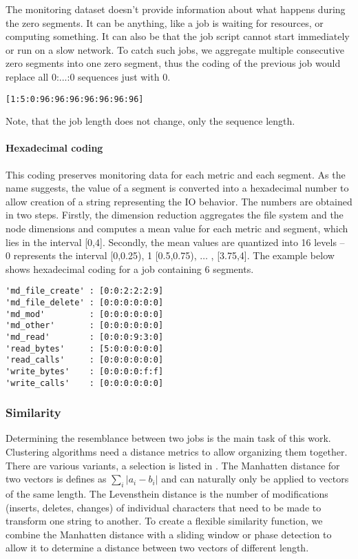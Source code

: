 \documentclass{jhps}
\begin{document}
The monitoring dataset doesn't provide information about what happens during the zero segments.
It can be anything, like a job is waiting for resources, or computing something.
It can also be that the job script cannot start immediately or run on a slow network.
To catch such jobs, we aggregate multiple consecutive zero segments into one zero segment, thus the coding of the previous job would replace all 0:...:0 sequences just with 0.

\begin{lstlisting}[caption={Binary coding of a 15 segments long job with zero aggregation applied.}]
[1:5:0:96:96:96:96:96:96:96]
\end{lstlisting}

Note, that the job length does not change, only the sequence length.

\paragraph*{Hexadecimal coding}

This coding preserves monitoring data for each metric and each segment.
As the name suggests, the value of a segment is converted into a hexadecimal number to allow creation of a string representing the IO behavior.
The numbers are obtained in two steps.
Firstly, the dimension reduction aggregates the file system and the node dimensions and computes a mean value for each metric and segment, which lies in the interval [0,4].
Secondly, the mean values are quantized into 16 levels -- 0 represents the interval [0,0.25), 1 [0.5,0.75), $ \ldots $ , [3.75,4].
The example below shows hexadecimal coding for a job containing 6 segments.

\begin{lstlisting}[caption={Hexadecimal coding of a six segments long job.}]
'md_file_create' : [0:0:2:2:2:9]
'md_file_delete' : [0:0:0:0:0:0]
'md_mod'         : [0:0:0:0:0:0]
'md_other'       : [0:0:0:0:0:0]
'md_read'        : [0:0:0:9:3:0]
'read_bytes'     : [5:0:0:0:0:0]
'read_calls'     : [0:0:0:0:0:0]
'write_bytes'    : [0:0:0:0:f:f]
'write_calls'    : [0:0:0:0:0:0]
\end{lstlisting}

\subsubsection{Similarity}
Determining the resemblance between two jobs is the main task of this work.
Clustering algorithms need a distance metrics to allow organizing them together.
There are various variants, a selection is listed in .
The Manhatten distance for two vectors is defines as $\sum_i |a_i - b_i|$ and can naturally only be applied to vectors of the same length.
The Levensthein distance is the number of modifications (inserts, deletes, changes) of individual characters that need to be made to transform one string to another.
To create a flexible similarity function, we combine the Manhatten distance with a sliding window or phase detection to allow it to determine a distance between two vectors of different length.
\end{document}

